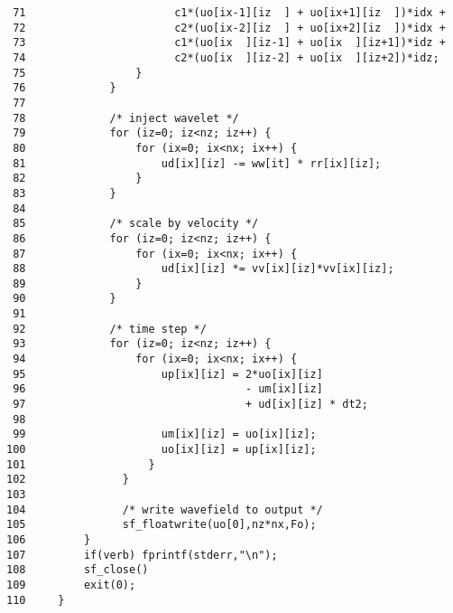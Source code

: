 \begin{verbatim}
 71                       c1*(uo[ix-1][iz  ] + uo[ix+1][iz  ])*idx +
 72                       c2*(uo[ix-2][iz  ] + uo[ix+2][iz  ])*idx +
 73                       c1*(uo[ix  ][iz-1] + uo[ix  ][iz+1])*idz +
 74                       c2*(uo[ix  ][iz-2] + uo[ix  ][iz+2])*idz;	  
 75                 }
 76             }
 77
 78             /* inject wavelet */
 79             for (iz=0; iz<nz; iz++) {
 80                 for (ix=0; ix<nx; ix++) {
 81                     ud[ix][iz] -= ww[it] * rr[ix][iz];
 82                 }
 83             }
 84 
 85             /* scale by velocity */
 86             for (iz=0; iz<nz; iz++) {
 87                 for (ix=0; ix<nx; ix++) {
 88                     ud[ix][iz] *= vv[ix][iz]*vv[ix][iz];
 89                 }
 90             }
 91
 92             /* time step */
 93             for (iz=0; iz<nz; iz++) {
 94                 for (ix=0; ix<nx; ix++) {
 95                     up[ix][iz] = 2*uo[ix][iz] 
 96                                  - um[ix][iz] 
 97                                  + ud[ix][iz] * dt2; 
 98                           
 99                     um[ix][iz] = uo[ix][iz];
100                     uo[ix][iz] = up[ix][iz];
101                   }
102               }
103     
104               /* write wavefield to output */
105               sf_floatwrite(uo[0],nz*nx,Fo);
106         }               
107         if(verb) fprintf(stderr,"\n");    
108         sf_close()
109         exit(0);
110     }
\end{verbatim}
	
